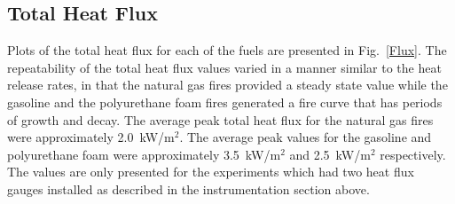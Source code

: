 \documentclass[twoside]{uocthesis}
\begin{document}
{\subsection{Total Heat Flux}

Plots of the total heat flux for each of the fuels are presented in Fig.~\ref{Flux}. The repeatability of the total heat flux values varied in a manner similar to the heat release rates, in that the natural gas fires provided a steady state value while the gasoline and the polyurethane foam fires generated a fire curve that has periods of growth and decay.  The average peak total heat flux for the natural gas fires were approximately 2.0~kW/m$^2$.  The average peak values for the gasoline and polyurethane foam were approximately 3.5~kW/m$^2$ and 2.5~kW/m$^2$ respectively.  The values are only presented for the experiments which had two heat flux gauges installed as described in the instrumentation section above.

}
\end{document}
